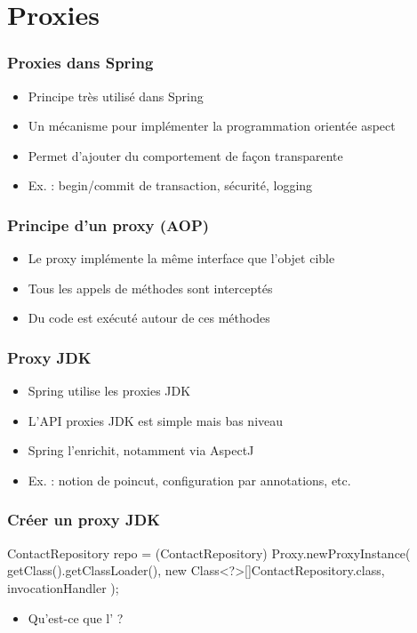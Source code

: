 \section{Proxies}



\begin{frame}
 \frametitle{Proxies dans Spring}
 \begin{itemize}
  \item Principe très utilisé dans Spring
  \item Un mécanisme pour implémenter la programmation orientée aspect
  \item Permet d'ajouter du comportement de façon transparente
  \item Ex. : begin/commit de transaction, sécurité, logging
 \end{itemize}

\end{frame}

\begin{frame}[fragile]
 \frametitle{Principe d'un proxy (AOP)}
 \begin{itemize}
  \item Le proxy implémente la même interface que l'objet cible
  \item Tous les appels de méthodes sont interceptés
  \item Du code est exécuté autour de ces méthodes
 \end{itemize}

\end{frame}



\begin{frame}
 \frametitle{Proxy JDK}
 \begin{itemize}
  \item Spring utilise les proxies JDK
  \item L'API proxies JDK est simple mais bas niveau
  \item Spring l'enrichit, notamment via AspectJ
  \item Ex. : notion de poincut, configuration par annotations, etc.
 \end{itemize}
\end{frame}

\begin{frame}[fragile]
 \frametitle{Créer un proxy JDK}

\begin{javacode}
ContactRepository repo = (ContactRepository) Proxy.newProxyInstance(
  getClass().getClassLoader(),
  new Class<?>[]{ContactRepository.class},
  invocationHandler
);
\end{javacode}

 \begin{itemize}
  \item Qu'est-ce que l' ?
 \end{itemize}

\end{frame}

